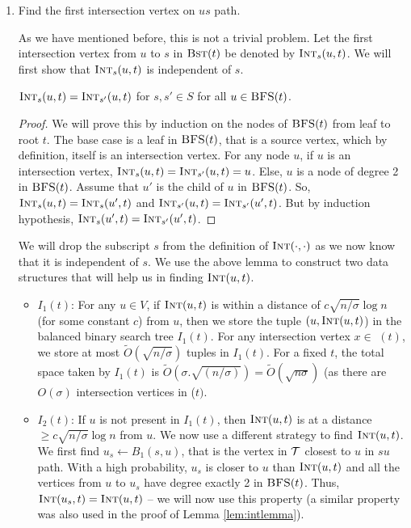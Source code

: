 \begin{enumerate}[leftmargin=*,noitemsep,nolistsep]
\item Find the first intersection vertex  on $us$ path.

\iflong
  \noindent As we have mentioned before, this is not a trivial problem.
  Let the first intersection vertex from $u$ to $s$ in $\textsc{Bst}(t)$ be
  denoted by  $\textsc{Int}_{s}(u,t)$.   We will first show that $\textsc{Int}_{s}(u,t)$ is independent of $s$.
  \begin{lemma}
  \label{lem:intlemma}
  $\textsc{Int}_s(u,t) = \textsc{Int}_{s'}(u,t)$ for $s,s' \in S$ for all $u \in \textsc{BFS}(t)$.
  \end{lemma}

  \iflong
  \begin{proof}
    We will prove this by induction on the nodes of $\textsc{BFS}(t)$ from leaf to root $t$.
    The base case is a leaf in $\textsc{BFS}(t)$, that is a source vertex, which by definition,
    itself is an intersection vertex. For any node $u$, if $u$ is an intersection vertex,
    $\textsc{Int}_s(u,t) = \textsc{Int}_{s'}(u,t) = u$. Else, $u$ is a node of degree 2 in $\textsc{BFS}(t)$.
    Assume that $u'$ is the child of $u$ in $\textsc{BFS}(t)$. So, $\textsc{Int}_s(u,t) = \textsc{Int}_s(u',t)$ and $\textsc{Int}_{s'}(u,t) = \textsc{Int}_{s'}(u',t)$. But by induction hypothesis,  $\textsc{Int}_s(u',t)=\textsc{Int}_{s'}(u',t)$.

    \end{proof}
  \fi

  \noindent We will drop the subscript $s$ from the definition of $\textsc{Int}(\cdot,\cdot)$ as we now know that it is independent of $s$. We use the
  above lemma to construct  two data structures that will help us in finding $\textsc{Int}(u,t)$.

  \begin{itemize}
  \item $I_1(t)$: For any $u \in V$, if $\textsc{Int}(u,t)$ is within a distance of $c\sqrt{n/\sigma} \log n$
  (for some constant $c$) from $u$, then we store the tuple
  $(u,\textsc{Int}(u,t)$) in the balanced binary search tree $I_1(t)$. For any  intersection
  vertex $x \in $ \SBFS$(t)$, we  store at most $\tilde O(\sqrt{n/\sigma})$ tuples in $I_1(t)$.
  For a fixed $t$, the total
  space taken by $I_1(t)$ is $\tilde O(\sigma .\sqrt{(n/\sigma)}
  )= \tilde O(\sqrt{n \sigma})$ (as there are $O(\sigma)$ intersection vertices in \SBFS($t)$.

  \item $I_2(t)$: If $u$ is not present in $I_1(t)$, then $\textsc{Int}(u,t)$ is at a distance
  $\ge c\sqrt{n /\sigma}\log n$ from $u$. We now
  use a different strategy to find $\textsc{Int}(u,t)$. We first find $u_s \leftarrow B_1(s,u)$,
  that is the vertex in $\mathcal{T}$
  closest to  $u$ in $su$ path. With a
high probability,
$u_s$ is closer to $u$ than $\textsc{Int}(u,t)$ and all the vertices from $u$ to $u_s$ have degree  exactly 2 in $\textsc{BFS}(t)$.
  Thus, $\textsc{Int}(u_s,t) = \textsc{Int}(u,t)$ -- we will now use this property (a similar property was also used in the proof of Lemma \ref{lem:intlemma}).


\end{itemize}
\end{enumerate}

